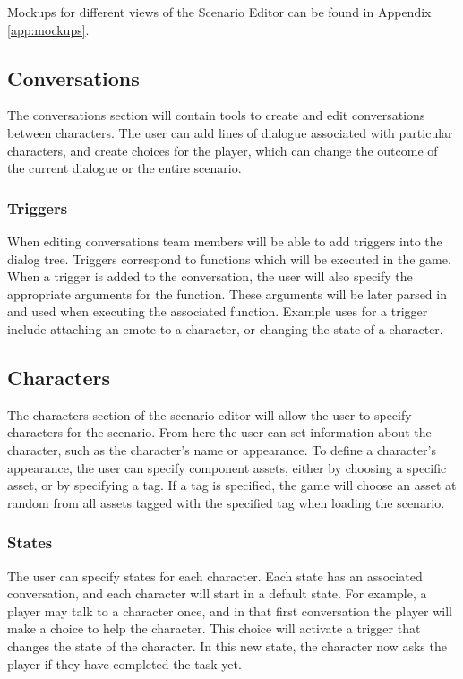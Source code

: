 Mockups for different views of the Scenario Editor can be found in Appendix \ref{app:mockups}.

\subsection{Conversations}
The conversations section will contain tools to create and edit conversations between characters. The user can add lines of dialogue associated with particular characters, and create choices for the player, which can change the outcome of the current dialogue or the entire scenario.
\subsubsection{Triggers}
When editing conversations team members will be able to add triggers into the dialog tree. Triggers correspond to functions which will be executed in the game. When a trigger is added to the conversation, the user will also specify the appropriate arguments for the function. These arguments will be later parsed in \ourgame{} and used when executing the associated function. Example uses for a trigger include attaching an emote to a character, or changing the state of a character.

\subsection{Characters}
The characters section of the scenario editor will allow the user to specify characters for the scenario. From here the user can set information about the character, such as the character's name or appearance. To define a character's appearance, the user can specify component assets, either by choosing a specific asset, or by specifying a tag. If a tag is specified, the game will choose an asset at random from all assets tagged with the specified tag when loading the scenario.
\subsubsection{States}
The user can specify states for each character. Each state has an associated conversation, and each character will start in a default state. For example, a player may talk to a character once, and in that first conversation the player will make a choice to help the character. This choice will activate a trigger that changes the state of the character. In this new state, the character now asks the player if they have completed the task yet.


